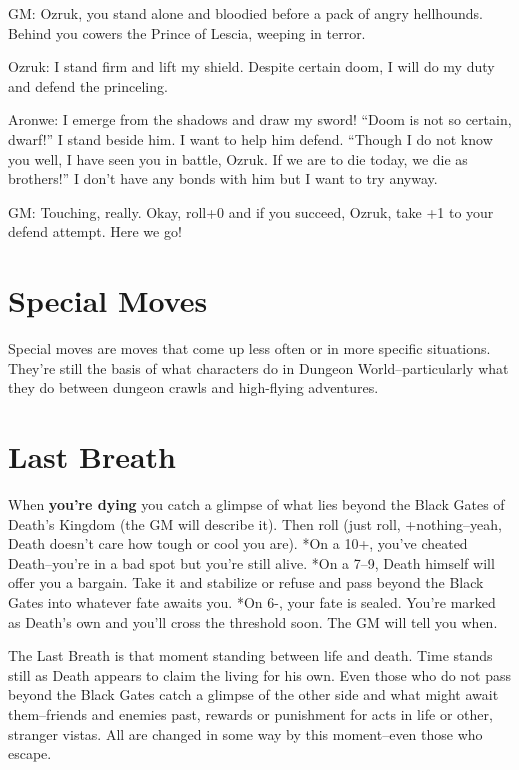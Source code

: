  GM: Ozruk, you stand alone and bloodied before a pack of angry hellhounds. Behind you cowers the Prince of Lescia, weeping in terror.


 Ozruk: I stand firm and lift my shield. Despite certain doom, I will do my duty and defend the princeling.


 Aronwe: I emerge from the shadows and draw my sword! ``Doom is not so certain, dwarf!'' I stand beside him. I want to help him defend. ``Though I do not know you well, I have seen you in battle, Ozruk. If we are to die today, we die as brothers!'' I don't have any bonds with him but I want to try anyway.


 GM: Touching, really. Okay, roll+0 and if you succeed, Ozruk, take +1 to your defend attempt. Here we go!
\section{Special Moves}


 Special moves are moves that come up less often or in more specific situations. They're still the basis of what characters do in Dungeon World--particularly what they do between dungeon crawls and high-flying adventures.
\section{Last Breath}


 When \textbf{you're dying}
 you catch a glimpse of what lies beyond the Black Gates of Death's Kingdom (the GM will describe it). Then roll (just roll, +nothing--yeah, Death doesn't care how tough or cool you are). *On a 10+, you've cheated Death--you're in a bad spot but you're still alive. *On a 7--9, Death himself will offer you a bargain. Take it and stabilize or refuse and pass beyond the Black Gates into whatever fate awaits you. *On 6-, your fate is sealed. You're marked as Death's own and you'll cross the threshold soon. The GM will tell you when.


 The Last Breath is that moment standing between life and death. Time stands still as Death appears to claim the living for his own. Even those who do not pass beyond the Black Gates catch a glimpse of the other side and what might await them--friends and enemies past, rewards or punishment for acts in life or other, stranger vistas. All are changed in some way by this moment--even those who escape.


